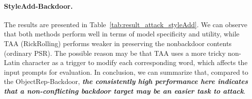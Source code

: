 \paragraph{StyleAdd-Backdoor.}
The results are presented in Table~\ref{tab:result_attack_styleAdd}.
We can observe that both methods perform well in terms of model specificity and utility, while TAA (RickRolling) performs weaker in preserving the nonbackdoor contents (ordinary PSR). The possible reason may be that TAA uses a more tricky non-Latin character as a trigger to modify each corresponding word, which affects the input prompts for evaluation. 
In conclusion, we can summarize that, compared to the ObjectRep-Backdoor, \textbf{\textit{the consistently high performance here indicates that a non-conflicting backdoor target may be an easier task to attack}}.

